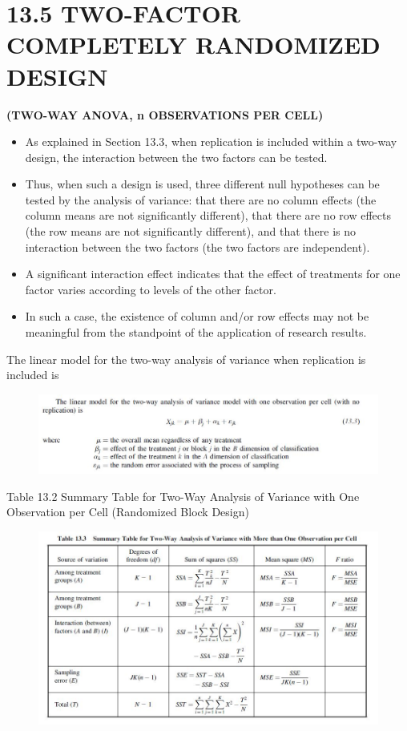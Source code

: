 \documentclass[]{article}
\begin{document}
\section{13.5 TWO-FACTOR COMPLETELY RANDOMIZED DESIGN}
\noindent \textbf{(TWO-WAY ANOVA, n OBSERVATIONS PER CELL)}

\begin{itemize}
\item As explained in Section 13.3, when replication is included within a two-way design, the interaction
between the two factors can be tested.
\item Thus, when such a design is used, three different null hypotheses can be
tested by the analysis of variance: that there are no column effects (the column means are not significantly
different), that there are no row effects (the row means are not significantly different), and that there is no
interaction between the two factors (the two factors are independent). 
\item A significant interaction effect indicates
that the effect of treatments for one factor varies according to levels of the other factor. 
\item In such a case, the
existence of column and/or row effects may not be meaningful from the standpoint of the application of
research results.
\end{itemize}
The linear model for the two-way analysis of variance when replication is included is
\begin{figure}
\centering
\includegraphics[width=1.1\linewidth]{TwoWayANOVA-Equation1}
\caption{}
\label{fig:TwoWayANOVA-Equation1}
\end{figure}

Table 13.2 Summary Table for Two-Way Analysis of Variance with One Observation per Cell (Randomized
Block Design)
\begin{figure}
\centering
\includegraphics[width=0.7\linewidth]{TwoWayANOVA-Table2}
\caption{}
\label{fig:TwoWayANOVA-Table2}
\end{figure}
\end{document}
